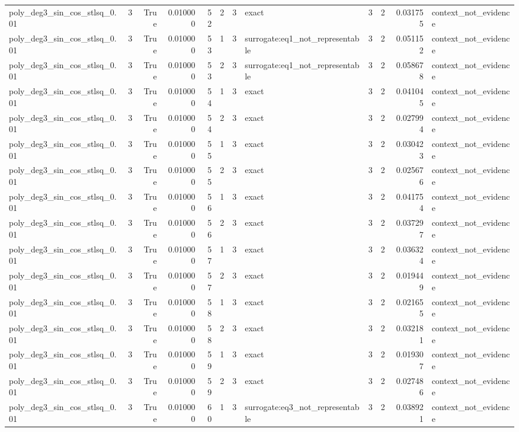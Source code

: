 \begin{tabular}{lrrrrrrlrrrl}
poly\_deg3\_sin\_cos\_stlsq\_0.01 & 3 & True & 0.010000 & 52 & 2 & 3 & exact & 3 & 2 & 0.031755 & context\_not\_evidence \\
poly\_deg3\_sin\_cos\_stlsq\_0.01 & 3 & True & 0.010000 & 53 & 1 & 3 & surrogate:eq1\_not\_representable & 3 & 2 & 0.051152 & context\_not\_evidence \\
poly\_deg3\_sin\_cos\_stlsq\_0.01 & 3 & True & 0.010000 & 53 & 2 & 3 & surrogate:eq1\_not\_representable & 3 & 2 & 0.058678 & context\_not\_evidence \\
poly\_deg3\_sin\_cos\_stlsq\_0.01 & 3 & True & 0.010000 & 54 & 1 & 3 & exact & 3 & 2 & 0.041045 & context\_not\_evidence \\
poly\_deg3\_sin\_cos\_stlsq\_0.01 & 3 & True & 0.010000 & 54 & 2 & 3 & exact & 3 & 2 & 0.027994 & context\_not\_evidence \\
poly\_deg3\_sin\_cos\_stlsq\_0.01 & 3 & True & 0.010000 & 55 & 1 & 3 & exact & 3 & 2 & 0.030423 & context\_not\_evidence \\
poly\_deg3\_sin\_cos\_stlsq\_0.01 & 3 & True & 0.010000 & 55 & 2 & 3 & exact & 3 & 2 & 0.025676 & context\_not\_evidence \\
poly\_deg3\_sin\_cos\_stlsq\_0.01 & 3 & True & 0.010000 & 56 & 1 & 3 & exact & 3 & 2 & 0.041754 & context\_not\_evidence \\
poly\_deg3\_sin\_cos\_stlsq\_0.01 & 3 & True & 0.010000 & 56 & 2 & 3 & exact & 3 & 2 & 0.037297 & context\_not\_evidence \\
poly\_deg3\_sin\_cos\_stlsq\_0.01 & 3 & True & 0.010000 & 57 & 1 & 3 & exact & 3 & 2 & 0.036324 & context\_not\_evidence \\
poly\_deg3\_sin\_cos\_stlsq\_0.01 & 3 & True & 0.010000 & 57 & 2 & 3 & exact & 3 & 2 & 0.019449 & context\_not\_evidence \\
poly\_deg3\_sin\_cos\_stlsq\_0.01 & 3 & True & 0.010000 & 58 & 1 & 3 & exact & 3 & 2 & 0.021655 & context\_not\_evidence \\
poly\_deg3\_sin\_cos\_stlsq\_0.01 & 3 & True & 0.010000 & 58 & 2 & 3 & exact & 3 & 2 & 0.032181 & context\_not\_evidence \\
poly\_deg3\_sin\_cos\_stlsq\_0.01 & 3 & True & 0.010000 & 59 & 1 & 3 & exact & 3 & 2 & 0.019307 & context\_not\_evidence \\
poly\_deg3\_sin\_cos\_stlsq\_0.01 & 3 & True & 0.010000 & 59 & 2 & 3 & exact & 3 & 2 & 0.027486 & context\_not\_evidence \\
poly\_deg3\_sin\_cos\_stlsq\_0.01 & 3 & True & 0.010000 & 60 & 1 & 3 & surrogate:eq3\_not\_representable & 3 & 2 & 0.038921 & context\_not\_evidence \\

\end{tabular}
